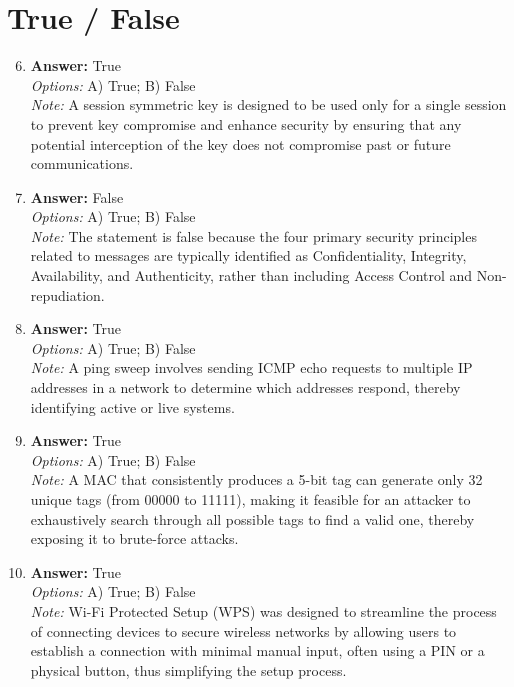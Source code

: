 \documentclass[12pt]{article}
\begin{document}
\section*{True / False}
\begin{enumerate}[label=\arabic*.]
\setcounter{enumi}{5}
\item \textbf{Answer:} True
\\ \textit{Options:} A) True; B) False
\\ \textit{Note:} A session symmetric key is designed to be used only for a single session to prevent key compromise and enhance security by ensuring that any potential interception of the key does not compromise past or future communications.
\item \textbf{Answer:} False
\\ \textit{Options:} A) True; B) False
\\ \textit{Note:} The statement is false because the four primary security principles related to messages are typically identified as Confidentiality, Integrity, Availability, and Authenticity, rather than including Access Control and Non-repudiation.
\item \textbf{Answer:} True
\\ \textit{Options:} A) True; B) False
\\ \textit{Note:} A ping sweep involves sending ICMP echo requests to multiple IP addresses in a network to determine which addresses respond, thereby identifying active or live systems.
\item \textbf{Answer:} True
\\ \textit{Options:} A) True; B) False
\\ \textit{Note:} A MAC that consistently produces a 5-bit tag can generate only 32 unique tags (from 00000 to 11111), making it feasible for an attacker to exhaustively search through all possible tags to find a valid one, thereby exposing it to brute-force attacks.
\item \textbf{Answer:} True
\\ \textit{Options:} A) True; B) False
\\ \textit{Note:} Wi-Fi Protected Setup (WPS) was designed to streamline the process of connecting devices to secure wireless networks by allowing users to establish a connection with minimal manual input, often using a PIN or a physical button, thus simplifying the setup process.
\end{enumerate}
\end{document}
